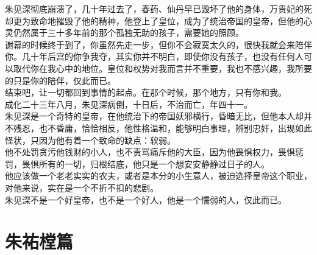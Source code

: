 \begin{multicols}{\theparacolNo}
朱见深彻底崩溃了，几十年过去了，春药、仙丹早已毁坏了他的身体，万贵妃的死却更为致命地摧毁了他的精神，他登上了皇位，成为了统治帝国的皇帝，但他的心灵仍然属于三十多年前的那个孤独无助的孩子，需要她的照顾。\\

谢幕的时候终于到了，你虽然先走一步，但你不会寂寞太久的，很快我就会来陪伴你。几十年后宫的你争我夺，其实你并不明白，即使你没有孩子，也没有任何人可以取代你在我心中的地位。皇位和权势对我而言并不重要，我也不感兴趣，我所要的只是你的陪伴，仅此而已。\\

结束吧，让一切都回到事情的起点。在那个时候，那个地方，只有你和我。\\

成化二十三年八月，朱见深病倒，十日后，不治而亡，年四十一。\\

朱见深是一个奇特的皇帝，在他统治下的帝国妖邪横行，昏暗无比，但他本人却并不残忍，也不昏庸，恰恰相反，他性格温和，能够明白事理，辨别忠奸，出现如此怪状，只因为他有着一个致命的缺点：软弱。\\

他不处罚贪污他钱财的小人，也不责骂痛斥他的大臣，因为他畏惧权力，畏惧惩罚，畏惧所有的一切，归根结底，他只是一个想安安静静过日子的人。\\

他应该做一个老老实实的农夫，或者是本分的小生意人，被迫选择皇帝这个职业，对他来说，实在是一个不折不扣的悲剧。\\

朱见深不是一个好皇帝，也不是一个好人，他是一个懦弱的人，仅此而已。\\
\ifnum{}
	\end{multicols}
\fi
\newpage
\chapter*{朱祐樘篇}
